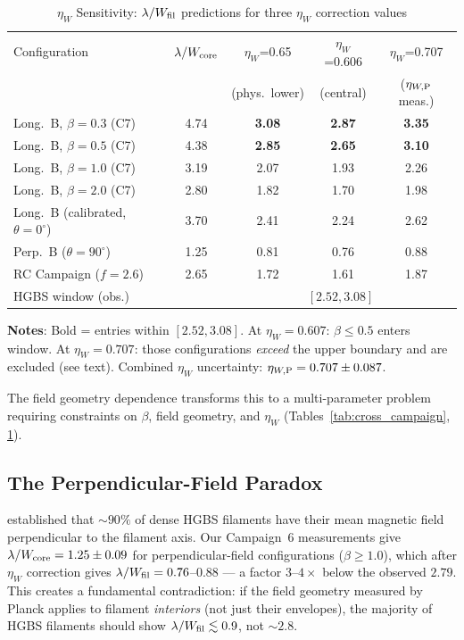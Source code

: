\documentclass[twoside,twocolumn]{mnras}
\begin{document}
\begin{table}
\caption{$\eta_W$ Sensitivity: $\lambda/W_{\rm fil}$ predictions for three $\eta_W$ correction values}
\label{tab:t1_budget}
\small
\begin{tabular}{lcccc}
\toprule
Configuration & $\lambda/W_{\rm core}$ & $\eta_W$=0.65 & $\eta_W$=0.606 & $\eta_W$=0.707 \\
              &                       & (phys.\ lower) & (central) & ($\eta_{W,{\rm P}}$ meas.) \\
\midrule
Long.\ B, $\beta=0.3$ (C7) & 4.74 & \textbf{3.08} & \textbf{2.87} & \textbf{3.35} \\
Long.\ B, $\beta=0.5$ (C7) & 4.38 & \textbf{2.85} & \textbf{2.65} & \textbf{3.10} \\
Long.\ B, $\beta=1.0$ (C7) & 3.19 & 2.07 & 1.93 & 2.26 \\
Long.\ B, $\beta=2.0$ (C7) & 2.80 & 1.82 & 1.70 & 1.98 \\
Long.\ B (calibrated, $\theta=0^\circ$) & 3.70 & 2.41 & 2.24 & 2.62 \\
Perp.\ B ($\theta=90^\circ$) & 1.25 & 0.81 & 0.76 & 0.88 \\
RC Campaign ($f=2.6$) & 2.65 & 1.72 & 1.61 & 1.87 \\
\midrule
\multicolumn{2}{l}{HGBS window (obs.)} & \multicolumn{3}{c}{$[2.52, 3.08]$} \\
\bottomrule
\end{tabular}
\vspace{2pt}
\footnotesize
\textbf{Notes}: Bold = entries within $[2.52, 3.08]$. At $\eta_W = 0.607$: $\beta \leq 0.5$ enters window. At $\eta_W = 0.707$: those configurations \textit{exceed} the upper boundary and are excluded (see text). Combined $\eta_W$ uncertainty: $\eta_{W,{\rm P}} = 0.707 \pm 0.087$.
\end{table}

The field geometry dependence transforms this to a multi-parameter problem requiring
constraints on $\beta$, field geometry, and $\eta_W$ (Tables~\ref{tab:cross_campaign}, \ref{tab:t1_budget}).

\subsection{The Perpendicular-Field Paradox}
\label{sec:perp_paradox}

\citet{Planck2016} established that ${\sim}90\%$ of dense HGBS filaments have their
mean magnetic field perpendicular to the filament axis. Our Campaign~6 measurements
give $\lambda/W_{\rm core} = 1.25 \pm 0.09$ for perpendicular-field configurations
($\beta \geq 1.0$), which after $\eta_W$ correction gives $\lambda/W_{\rm fil} = 0.76$--$0.88$
--- a factor $3$--$4\times$ below the observed $2.79$. This creates a fundamental
contradiction: if the field geometry measured by Planck applies to filament \textit{interiors}
(not just their envelopes), the majority of HGBS filaments should show $\lambda/W_{\rm fil}
\lesssim 0.9$, not ${\sim}2.8$.
\end{document}
